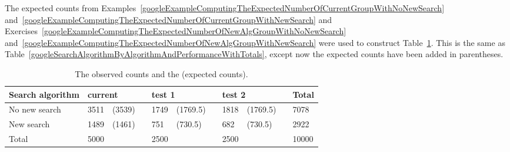 The expected counts from Examples~\ref{googleExampleComputingTheExpectedNumberOfCurrentGroupWithNoNewSearch} and~\ref{googleExampleComputingTheExpectedNumberOfCurrentGroupWithNewSearch} and Exercises~\ref{googleExampleComputingTheExpectedNumberOfNewAlgGroupWithNoNewSearch} and~\ref{googleExampleComputingTheExpectedNumberOfNewAlgGroupWithNewSearch} were used to construct Table~\ref{googleSearchAlgorithmByAlgorithmAndPerformanceWithExpectedCounts}. This is the same as Table~\ref{googleSearchAlgorithmByAlgorithmAndPerformanceWithTotals}, except now the expected counts have been added in parentheses.
\begin{table}[h]
\centering
\begin{tabular}{l lll lll lll l}
\hline
Search algorithm\hspace{2mm} & \multicolumn{2}{l}{current} &&
					\multicolumn{2}{l}{test 1} &&
					\multicolumn{2}{l}{test 2} & \hspace{0mm} & Total \\
\hline
No new search		   & 3511 &\color{steelBlue}\footnotesize(3539)    &&
					1749 &\color{steelBlue}\footnotesize(1769.5)	&&
					1818 &\color{steelBlue}\footnotesize(1769.5) &	& 7078 \\
New search		   & 1489 &\color{steelBlue}\footnotesize(1461)    && 
					751 &\color{steelBlue}\footnotesize(730.5)	&& 
					682 &\color{steelBlue}\footnotesize(730.5)    &		& 2922 \\
\hline
Total				   & 5000 &&& 	2500 &&& 	2500 &&& 	10000 \\
\hline
\end{tabular}
\caption{The observed counts and the {\color{steelBlue}(expected counts)}.}
\label{googleSearchAlgorithmByAlgorithmAndPerformanceWithExpectedCounts}
\end{table}

